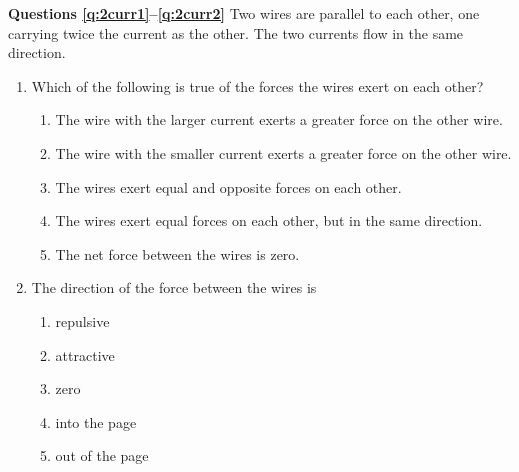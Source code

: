 \documentclass{../../../oss-classkick}
\begin{document}
\begin{multicols}{2}
  \textbf{Questions \ref{q:2curr1}--\ref{q:2curr2}} Two wires are parallel to
  each other, one carrying twice the current as the other. The two currents
  flow in the same direction.

  \begin{enumerate}[leftmargin=18pt,resume]
  \item Which of the following is true of the forces the wires exert on each
    other?
    \begin{enumerate}[nosep,leftmargin=18pt,label=(\Alph*)]
    \item The wire with the larger current exerts a greater force on the other
      wire.
    \item The wire with the smaller current exerts a greater force on the other
      wire.
    \item The wires exert equal and opposite forces on each other.
    \item The wires exert equal forces on each other, but in the same direction.
    \item The net force between the wires is zero.
    \end{enumerate}
    \label{q:2curr1}
    \vspace{.7in}
    
  \item The direction of the force between the wires is
    \begin{enumerate}[nosep,leftmargin=18pt,label=(\Alph*)]
    \item repulsive
    \item attractive
    \item zero
    \item into the page
    \item out of the page
    \end{enumerate}
    \label{q:2curr2}
    \vspace{.7in}
    

\end{enumerate}
\end{multicols}
\end{document}
